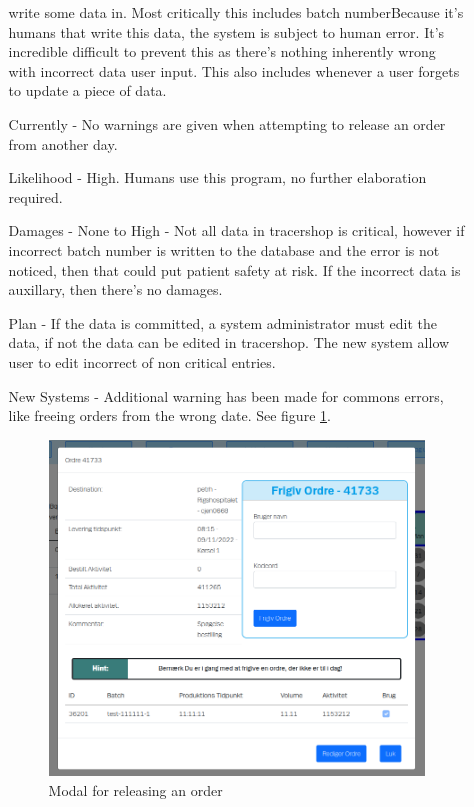 \documentclass{article}
\begin{document}
\begin{itemize}
\begin{itemize}
    write some data in. Most critically this includes batch numberBecause it's
    humans that write this data, the system is subject to human error.
    It's incredible difficult to prevent this as there's nothing inherently
    wrong with \gls{incorrect data} user input. This also includes whenever a
    user forgets to update a piece of data.
    \item[Currently] - No warnings are given when attempting to release an order
    from another day.
    \item[Likelihood] - High. Humans use this program, no further
    elaboration required.
    \item[Damages] - None to High - Not all data in tracershop is critical,
    however if incorrect batch number is written to the database and the error
    is not noticed, then that could put patient safety at risk. If the incorrect
    data is auxillary, then there's no damages.
    \item[Plan] - If the data is committed, a system administrator must edit the
    data, if not the data can be edited in tracershop. The new system allow user
    to edit incorrect of non critical entries.
    \item[New Systems] - Additional warning has been made for commons errors,
    like freeing orders from the wrong date. See figure \ref{fig:dayhint}.

    \begin{figure}[ht]
      \begin{center}
        \includegraphics[width=0.6\linewidth]{figures/DayHint.png}
      \end{center}
      \caption{Modal for releasing an order}
      \label{fig:dayhint}
    \end{figure}


\end{itemize}
\end{itemize}
\end{document}

